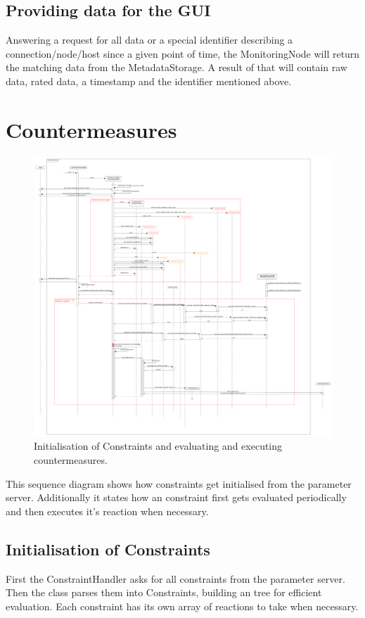 \subsection*{Providing data for the GUI}
Answering a request for all data or a special identifier describing a connection/node/host since a given point of time, the MonitoringNode will return the matching data from the MetadataStorage.
A result of that will contain raw data, rated data, a timestamp and the identifier mentioned above.
 
\newpage 
\section{Countermeasures} 
\begin{figure}[!ht] 
	\begin{center} 
		\includegraphics[width=1.0\linewidth]{./diagram_pictures/reactor/reactor_seq.pdf} 
		\caption{Initialisation of Constraints and evaluating and executing countermeasures.} 
	\end{center} 
\end{figure}
This sequence diagram shows how constraints get initialised from the parameter server. Additionally it states how an constraint first gets evaluated periodically and then executes it's reaction when necessary.
\subsection*{Initialisation of Constraints}
First the ConstraintHandler asks for all constraints from the parameter server. Then the class parses them into Constraints, building an tree for efficient evaluation. Each constraint has its own array of reactions to take when necessary.

